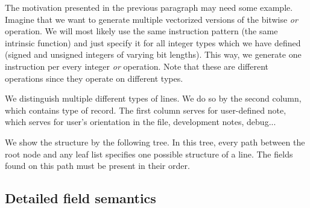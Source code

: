 The motivation presented in the previous paragraph may need some example. Imagine that we want to generate multiple vectorized versions of the bitwise \emph{or} operation. We will most likely use the same instruction pattern (the same intrinsic function) and just specify it for all integer types which we have defined (signed and unsigned integers of varying bit lengths). This way, we generate one instruction per every integer \emph{or} operation. Note that these are different operations since they operate on different types.

We distinguish multiple different types of lines. We do so by the second column, which contains type of record. The first column serves for user-defined note, which serves for user's orientation in the file, development notes, debug...

We show the structure by the following tree. In this tree, every path between the root node and any leaf list specifies one possible structure of a line. The fields found on this path must be present in their order.


\subsection{Detailed field semantics}

